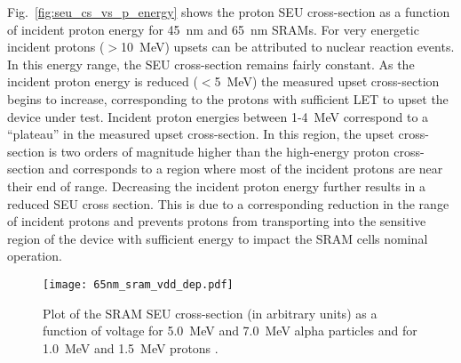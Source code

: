 Fig.~\ref{fig:seu_cs_vs_p_energy} shows the proton SEU cross-section as a function of incident proton energy for 45~nm and 65~nm SRAMs.
For very energetic incident protons ($>$10~MeV) upsets can be attributed to nuclear reaction events.
In this energy range, the SEU cross-section remains fairly constant.
As the incident proton energy is reduced ($<$5~MeV) the measured upset cross-section begins to increase, corresponding to the protons with sufficient LET to upset the device under test.
Incident proton energies between 1-4~MeV correspond to a ``plateau'' in the measured upset cross-section.
In this region, the upset cross-section is two orders of magnitude higher than the high-energy proton cross-section and corresponds to a region where most of the incident protons are near their end of range.
Decreasing the incident proton energy further results in a reduced SEU cross section.
This is due to a corresponding reduction in the range of incident protons and prevents protons from transporting into the sensitive region of the device with sufficient energy to impact the SRAM cells nominal operation.

\begin{figure}[htbp]
    \begin{center}
        \texttt{[image: 65nm\_sram\_vdd\_dep.pdf]}
    \end{center}
    \caption[Plot of the SRAM SEU cross-section (in arbitrary units) as a function of voltage for 5.0~MeV and 7.0~MeV alpha particles and for 1.0~MeV and 1.5~MeV protons.]{Plot of the SRAM SEU cross-section (in arbitrary units) as a function of voltage for 5.0~MeV and 7.0~MeV alpha particles and for 1.0~MeV and 1.5~MeV protons \cite{Rodbell:2007vl}.}
    \label{fig:seu_cs_vs_appl_bias_protons}
\end{figure}

